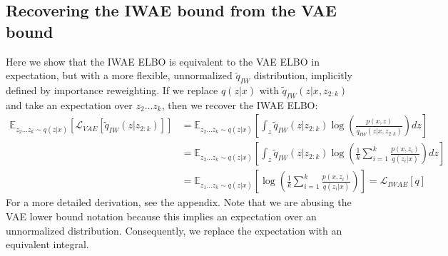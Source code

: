 \documentclass{article} %
\begin{document}
\subsection{Recovering the IWAE bound from the VAE bound}

Here we show that the IWAE ELBO is equivalent to the VAE ELBO in expectation, but with a more flexible, unnormalized $\tilde{q}_{IW}$ distribution, implicitly defined by importance reweighting.
If we replace $q(z|x)$ with $\tilde{q}_{IW}(z|x,z_{2:k})$ and take an expectation over $z_2 \dots z_k$, then we recover the IWAE ELBO:
\begin{align}
        \mathbb{E}_{z_{2} \dots z_{k}\sim q(z|x)} \left[ \mathcal{L}_{VAE}[\tilde{q}_{IW}(z|z_{2:k})] \right]
    &= \mathbb{E}_{z_{2} \dots z_{k} \sim q(z|x)} \left[ \int_{z} \tilde{q}_{IW}(z|z_{2:k})  \log\left(\frac{p(x,z)}{\tilde{q}_{IW}(z|x,z_{2:k})} \right)  dz \right] \nonumber \\
    &= \mathbb{E}_{z_{2} \dots z_{k} \sim q(z|x)} \left[ \int_{z} \tilde{q}_{IW}(z|z_{2:k}) \log\left(\frac{1}{k}   \sum_{i=1}^k \frac{p(x,z_i)}{q(z_i|x)} \right)  dz \right] \nonumber \\
    &= \mathbb{E}_{z_{1} \dots z_{k} \sim q(z|x)} \left[  \log\left(\frac{1}{k}   \sum_{i=1}^k \frac{p(x,z_i)}{q(z_i|x)} \right)  \right]  = \mathcal{L}_{IWAE}[q] \nonumber
\end{align}
For a more detailed derivation, see the appendix. Note that we are abusing the VAE lower bound notation because this implies an expectation over an unnormalized distribution. Consequently, we replace the expectation with an equivalent integral.
\end{document}
